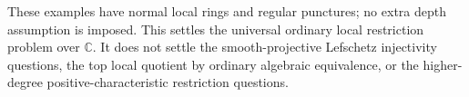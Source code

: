 These examples have normal local rings and regular
punctures; no extra depth assumption is imposed.
This settles the universal
ordinary local restriction problem over $\mathbb C$.
It does not settle the smooth-projective Lefschetz
injectivity questions, the top local quotient by
ordinary algebraic equivalence, or the higher-degree
positive-characteristic restriction questions.
